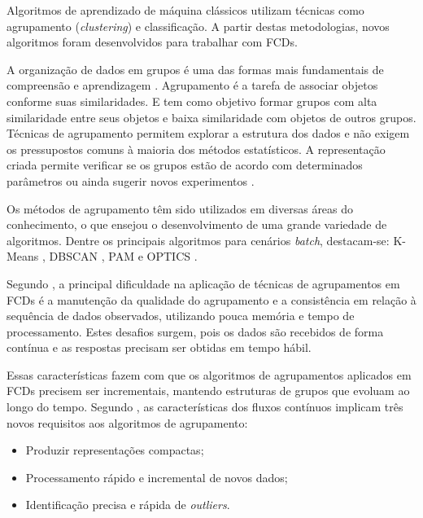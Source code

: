 \documentclass[qual, classic, a4paper]{ufbathesis}
\begin{document}
Algoritmos de aprendizado de máquina clássicos utilizam técnicas como agrupamento (\textit{clustering}) e classificação.
A partir destas metodologias, novos algoritmos foram desenvolvidos para trabalhar com FCDs.

A organização de dados em grupos é uma das formas mais fundamentais de compreensão e aprendizagem \cite{Jain:1988:ACD:46712}.
Agrupamento é a tarefa de associar objetos conforme suas similaridades.
E tem como objetivo formar grupos com alta similaridade entre seus objetos e baixa similaridade com objetos de outros grupos.
Técnicas de agrupamento permitem explorar a estrutura dos dados e não exigem os pressupostos comuns à maioria dos métodos estatísticos.
A representação criada permite verificar se os grupos estão de acordo com determinados parâmetros ou ainda sugerir novos experimentos \cite{Jain:1988:ACD:46712}.

Os métodos de agrupamento têm sido utilizados em diversas áreas do conhecimento, o que ensejou o desenvolvimento de uma grande variedade de algoritmos.
Dentre os principais algoritmos para cenários \textit{batch}, destacam-se:
K-Means \cite{Lloyd:2006:LSQ:2263356.2269955},
DBSCAN \cite{Ester:1996:DAD:3001460.3001507},
PAM \cite{kaufman:clustering1990} e 
OPTICS \cite{Ankerst:1999:OOP:304181.304187}.

Segundo \cite{Gama:2010:KDD:1855075}, a principal dificuldade na aplicação de técnicas de agrupamentos em FCDs é 
a manutenção da qualidade do agrupamento e a consistência em relação à sequência de dados observados, utilizando pouca memória e tempo de processamento. 
Estes desafios surgem, pois os dados são recebidos de forma contínua e as respostas precisam ser obtidas em tempo hábil.

Essas características fazem com que os algoritmos de agrupamentos aplicados em FCDs precisem ser incrementais, mantendo estruturas de grupos que evoluam ao longo do tempo.
Segundo \cite{Barbara:2002:RCD:507515.507519}, as características dos fluxos contínuos implicam três novos requisitos aos algoritmos de agrupamento:

\begin{itemize}
    \item Produzir representações compactas;
    \item Processamento rápido e incremental de novos dados;
    \item Identificação precisa e rápida de \textit{outliers}.
\end{itemize}
\end{document}
